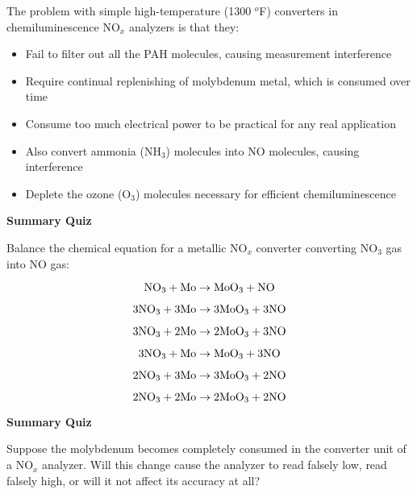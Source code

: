 The problem with simple high-temperature (1300 $^{o}$F) converters in chemiluminescence NO$_{x}$ analyzers is that they:

\begin{itemize}
\item{} Fail to filter out all the PAH molecules, causing measurement interference
\vskip 5pt
\item{} Require continual replenishing of molybdenum metal, which is consumed over time
\vskip 5pt
\item{} Consume too much electrical power to be practical for any real application
\vskip 5pt
\item{} Also convert ammonia (NH$_{3}$) molecules into NO molecules, causing interference
\vskip 5pt
\item{} Deplete the ozone (O$_{3}$) molecules necessary for efficient chemiluminescence
\end{itemize}





\vfil \eject

\noindent
{\bf Summary Quiz}

Balance the chemical equation for a metallic NO$_{x}$ converter converting NO$_{3}$ gas into NO gas:

$$\hbox{NO}_3 + \hbox{Mo} \to \hbox{MoO}_3 + \hbox{NO}$$

$$3\hbox{NO}_3 + 3\hbox{Mo} \to 3\hbox{MoO}_3 + 3\hbox{NO}$$

$$3\hbox{NO}_3 + 2\hbox{Mo} \to 2\hbox{MoO}_3 + 3\hbox{NO}$$

$$3\hbox{NO}_3 + \hbox{Mo} \to \hbox{MoO}_3 + 3\hbox{NO}$$

$$2\hbox{NO}_3 + 3\hbox{Mo} \to 3\hbox{MoO}_3 + 2\hbox{NO}$$

$$2\hbox{NO}_3 + 2\hbox{Mo} \to 2\hbox{MoO}_3 + 2\hbox{NO}$$




\vfil \eject

\noindent
{\bf Summary Quiz}

Suppose the molybdenum becomes completely consumed in the converter unit of a NO$_{x}$ analyzer.  Will this change cause the analyzer to read falsely low, read falsely high, or will it not affect its accuracy at all?





